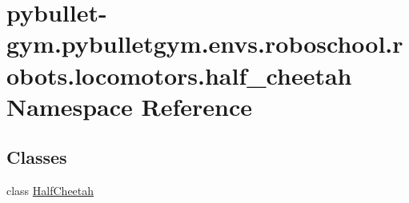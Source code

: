 \hypertarget{namespacepybullet-gym_1_1pybulletgym_1_1envs_1_1roboschool_1_1robots_1_1locomotors_1_1half__cheetah}{}\section{pybullet-\/gym.pybulletgym.\+envs.\+roboschool.\+robots.\+locomotors.\+half\+\_\+cheetah Namespace Reference}
\label{namespacepybullet-gym_1_1pybulletgym_1_1envs_1_1roboschool_1_1robots_1_1locomotors_1_1half__cheetah}
\subsection*{Classes}
\begin{DoxyCompactItemize}
\item 
class \hyperlink{classpybullet-gym_1_1pybulletgym_1_1envs_1_1roboschool_1_1robots_1_1locomotors_1_1half__cheetah_1_1_half_cheetah}{Half\+Cheetah}
\end{DoxyCompactItemize}
